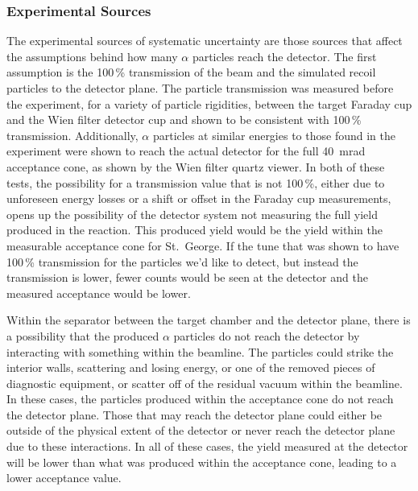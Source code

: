 \subsubsection{Experimental Sources}
The experimental sources of systematic uncertainty are those sources
that affect the assumptions behind how many $\alpha$ particles reach the
detector. The first assumption is the 100\,\% transmission of the beam
and the simulated recoil particles to the detector plane. The particle
transmission was measured before the experiment, for a variety of
particle rigidities, between the target Faraday cup and the Wien filter
detector cup and shown to be consistent with 100\,\% transmission.
Additionally, $\alpha$ particles at similar energies to those found in
the experiment were shown to reach the actual detector for the full
40~mrad acceptance cone, as shown by the Wien filter quartz viewer. In
both of these tests, the possibility for a transmission value that is
not 100\,\%, either due to unforeseen energy losses or a shift or offset
in the Faraday cup measurements, opens up the possibility of the
detector system not measuring the full yield produced in the reaction.
This produced yield would be the yield within the measurable acceptance
cone for St.\ George. If the tune that was shown to have 100\,\%
transmission for the particles we'd like to detect, but instead the
transmission is lower, fewer counts would be seen at the detector and
the measured acceptance would be lower.

Within the separator between the target chamber and the detector plane,
there is a possibility that the produced $\alpha$ particles do not reach
the detector by interacting with something within the beamline. The
particles could strike the interior walls, scattering and losing energy,
or one of the removed pieces of diagnostic equipment, or scatter off of
the residual vacuum within the beamline. In these cases, the particles
produced within the acceptance cone do not reach the detector plane.
Those that may reach the detector plane could either be outside of the
physical extent of the detector or never reach the detector plane due
to these interactions. In all of these cases, the yield measured at the
detector will be lower than what was produced within the acceptance
cone, leading to a lower acceptance value.

